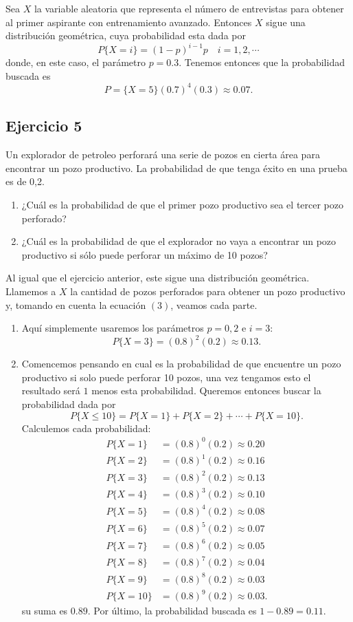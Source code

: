 \begin{sol}
	Sea $X$ la variable aleatoria que representa el número de entrevistas para obtener al primer aspirante con entrenamiento avanzado. Entonces $X$ sigue una distribución  geométrica, cuya probabilidad esta dada por
	\begin{equation}
		P\{X=i\} = (1-p)^{i-1}p \quad i=1,2,\cdots
	\end{equation}
	donde, en este caso, el parámetro $p=0.3$. Tenemos entonces que la probabilidad buscada es
	\[ P=\{ X=5 \} (0.7)^4(0.3) \approx 0.07. \]
\end{sol}
\subsection*{Ejercicio 5}
	Un explorador de petroleo perforará una serie de pozos en cierta área para encontrar un pozo productivo.
	La probabilidad de que tenga éxito en una prueba es de 0,2.
	\begin{enumerate}
		\item ¿Cuál es la probabilidad de que el primer pozo productivo sea el tercer pozo perforado?
		\item ¿Cuál es la probabilidad de que el explorador no vaya a encontrar un pozo productivo si sólo puede perforar
		un máximo de 10 pozos?
	\end{enumerate}

\begin{sol}
	Al igual que el ejercicio anterior, este sigue una distribución geométrica. Llamemos a $X$ la cantidad de pozos perforados para obtener un pozo productivo y, tomando en cuenta la ecuación $(3)$, veamos cada parte.
	\begin{enumerate}
		\item Aquí simplemente usaremos los parámetros $p=0\mathpunct{,}2$ e $i=3$:
		\[ P\{X=3\} = (0.8)^2(0.2) \approx 0.13. \]
		\item Comencemos pensando en cual es la probabilidad de que encuentre un pozo productivo si solo puede perforar 10 pozos, una vez tengamos esto el resultado será $1$ menos esta probabilidad. Queremos entonces buscar la probabilidad dada por
		\[ P\{X\leq 10 \} = P\{X=1\}+P\{X=2\}+\cdots+P\{X=10\}. \]
		Calculemos cada probabilidad:
		\begin{align*}
			P\{X=1\} &= (0.8)^0(0.2) \approx 0.20 \\
			P\{X=2\} &= (0.8)^1(0.2) \approx 0.16 \\
			P\{X=3\} &= (0.8)^2(0.2) \approx 0.13 \\
			P\{X=4\} &= (0.8)^3(0.2) \approx 0.10 \\
			P\{X=5\} &= (0.8)^4(0.2) \approx 0.08 \\
			P\{X=6\} &= (0.8)^5(0.2) \approx 0.07 \\
			P\{X=7\} &= (0.8)^6(0.2) \approx 0.05 \\
			P\{X=8\} &= (0.8)^7(0.2) \approx 0.04 \\
			P\{X=9\} &= (0.8)^8(0.2) \approx 0.03 \\
			P\{X=10\} &= (0.8)^9(0.2) \approx 0.03.
		\end{align*}
		su suma es $0.89$. Por último, la probabilidad buscada es $1-0.89 = 0.11$.
	\end{enumerate}
\end{sol}
